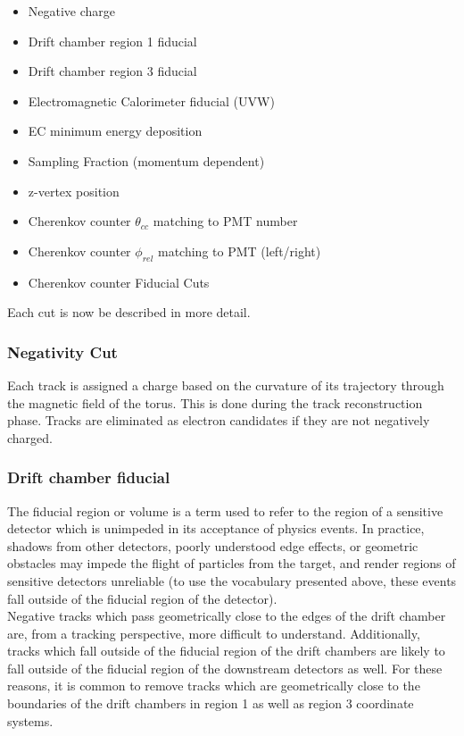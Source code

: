 \begin{itemize}
  \item{Negative charge}
  \item{Drift chamber region 1 fiducial}
  \item{Drift chamber region 3 fiducial}
  \item{Electromagnetic Calorimeter fiducial (UVW)}
  \item{EC minimum energy deposition}
  \item{Sampling Fraction (momentum dependent)}
  \item{z-vertex position}
  \item{Cherenkov counter $\theta_{cc}$ matching to PMT number}
  \item{Cherenkov counter $\phi_{rel}$ matching to PMT (left/right)}
  \item{Cherenkov counter Fiducial Cuts}
\end{itemize}

Each cut is now be described in more detail.

\subsubsection*{Negativity Cut}
Each track is assigned a charge based on the curvature of its trajectory through the magnetic field of the torus.  This is done during the track reconstruction phase.  Tracks are eliminated as electron candidates if they are not negatively charged.

\subsubsection*{Drift chamber fiducial}
The fiducial region or volume is a term used to refer to the region of a sensitive detector which is unimpeded in its acceptance of physics events.  In practice, shadows from other detectors, poorly understood edge effects, or geometric obstacles may impede the flight of particles from the target, and render regions of sensitive detectors unreliable (to use the vocabulary presented above, these events fall outside of the fiducial region of the detector).  \\

Negative tracks which pass geometrically close to the edges of the drift chamber are, from a tracking perspective, more difficult to understand.  Additionally, tracks which fall outside of the fiducial region of the drift chambers are likely to fall outside of the fiducial region of the downstream detectors as well.  For these reasons, it is common to remove tracks which are geometrically close to the boundaries of the drift chambers in region 1 as well as region 3 coordinate systems.\\


